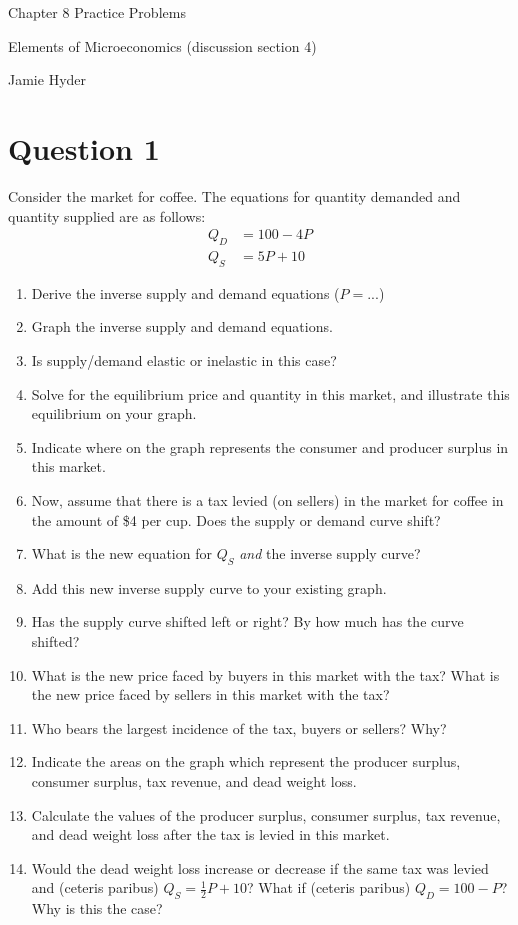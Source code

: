 \documentclass[12pt]{article}
\begin{document}
\begin{center}
\Large Chapter 8 Practice Problems

\medskip

\normalsize Elements of Microeconomics (discussion section 4)

\medskip

\small Jamie Hyder
\end{center}

\section*{Question 1}
Consider the market for coffee. The equations for quantity demanded and quantity supplied are as follows:
\begin{align*}
    Q_D &= 100-4P\\
    Q_S &= 5P + 10
\end{align*}
\begin{enumerate}[label=(\alph*)]

    \item Derive the inverse supply and demand equations ($P = ...$)
    \item Graph the inverse supply and demand equations.
    \item Is supply/demand elastic or inelastic in this case?
    \item Solve for the equilibrium price and quantity in this market, and illustrate this equilibrium on your graph.
    \item Indicate where on the graph represents the consumer and producer surplus in this market.
    \item Now, assume that there is a tax levied (on sellers) in the market for coffee in the amount of \$4 per cup. Does the supply or demand curve shift?
    \item What is the new equation for $Q_S$ \textit{and} the inverse supply curve?
    \item Add this new inverse supply curve to your existing graph. 
    \item Has the supply curve shifted left or right? By how much has the curve shifted?
    \item What is the new price faced by buyers in this market with the tax? What is the new price faced by sellers in this market with the tax?
    \item Who bears the largest incidence of the tax, buyers or sellers? Why?
    \item Indicate the areas on the graph which represent the producer surplus, consumer surplus, tax revenue, and dead weight loss.
    \item Calculate the values of the producer surplus, consumer surplus, tax revenue, and dead weight loss after the tax is levied in this market.
    \item Would the dead weight loss increase or decrease if the same tax was levied and (ceteris paribus) $Q_S = \frac{1}{2}P + 10$? What if (ceteris paribus) $Q_D = 100 - P$? Why is this the case? 
\end{enumerate}
\end{document}
